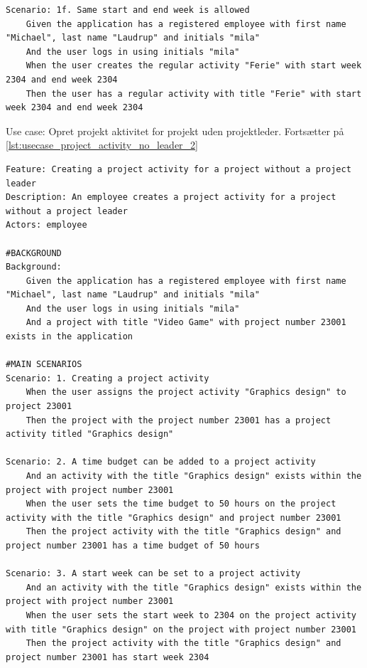 \begin{listing}[H]
\begin{verbatim}
Scenario: 1f. Same start and end week is allowed
    Given the application has a registered employee with first name "Michael", last name "Laudrup" and initials "mila"
    And the user logs in using initials "mila"
    When the user creates the regular activity "Ferie" with start week 2304 and end week 2304
    Then the user has a regular activity with title "Ferie" with start week 2304 and end week 2304
    \end{verbatim}
\end{listing}
\begin{listing}[H]
    \centering
    \caption{Use case: Opret projekt aktivitet for projekt uden projektleder. Fortsætter på \cref{lst:usecase_project_activity_no_leader_2}}\label{lst:usecase_project_activity_no_leader_1}
    \begin{verbatim}  
Feature: Creating a project activity for a project without a project leader
Description: An employee creates a project activity for a project without a project leader
Actors: employee

#BACKGROUND
Background:
    Given the application has a registered employee with first name "Michael", last name "Laudrup" and initials "mila"
    And the user logs in using initials "mila"
    And a project with title "Video Game" with project number 23001 exists in the application

#MAIN SCENARIOS
Scenario: 1. Creating a project activity
    When the user assigns the project activity "Graphics design" to project 23001
    Then the project with the project number 23001 has a project activity titled "Graphics design"

Scenario: 2. A time budget can be added to a project activity
    And an activity with the title "Graphics design" exists within the project with project number 23001
    When the user sets the time budget to 50 hours on the project activity with the title "Graphics design" and project number 23001
    Then the project activity with the title "Graphics design" and project number 23001 has a time budget of 50 hours

Scenario: 3. A start week can be set to a project activity
    And an activity with the title "Graphics design" exists within the project with project number 23001
    When the user sets the start week to 2304 on the project activity with title "Graphics design" on the project with project number 23001
    Then the project activity with the title "Graphics design" and project number 23001 has start week 2304


\end{verbatim}
\end{listing}
